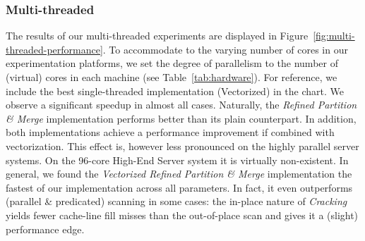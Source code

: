 \subsubsection*{Multi-threaded}
\label{sec:multi-threaded}
The results of our multi-threaded experiments are displayed in
Figure~\ref{fig:multi-threaded-performance}. To accommodate to the
varying number of cores in our experimentation platforms, we set the
degree of parallelism to the number of (virtual) cores in each machine
(see Table~\ref{tab:hardware}). For reference, we include the best
single-threaded implementation (Vectorized) in the chart. We observe a
significant speedup in almost all cases. Naturally, the \emph{Refined
  Partition \& Merge} implementation performs better than its plain
counterpart. In addition, both implementations achieve a performance
improvement if combined with vectorization. This effect is, however
less pronounced on the highly parallel server systems. On the 96-core
High-End Server system it is virtually non-existent. In general, we
found the \emph{Vectorized Refined Partition \& Merge} implementation
the fastest of our implementation across all parameters. In fact, it
even outperforms (parallel \& predicated) scanning in some cases: the
in-place nature of \emph{Cracking} yields fewer cache-line fill misses
than the out-of-place scan and gives it a (slight) performance edge.


